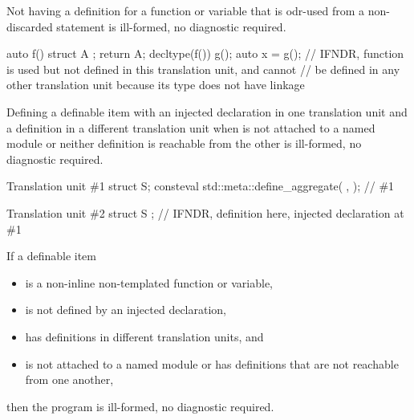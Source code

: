 
\pnum
Not having a definition
for a function or variable
that is odr-used from a non-discarded statement
is ill-formed, no diagnostic required.

\pnum
\begin{example}
\begin{codeblock}
auto f() {
  struct A {};
  return A{};
}
decltype(f()) g();
auto x = g();   // IFNDR, function  is used but not defined in this translation unit, and cannot
                // be defined in any other translation unit because its type does not have linkage
\end{codeblock}
\end{example}


\pnum
Defining a definable item 
with an injected declaration
in one translation unit and
a definition in a different translation unit
when  is not attached to a named module
or neither definition is reachable from the other
is ill-formed, no diagnostic required.

\pnum
\begin{example}
\begin{codeblocktu}{Translation unit \#1}
struct S;
consteval { std::meta::define_aggregate(^^S, {}); }     // \#1
\end{codeblocktu}
\begin{codeblocktu}{Translation unit \#2}
struct S {};    // IFNDR, definition here, injected declaration at \#1
\end{codeblocktu}
\end{example}


\pnum
If a definable item 
\begin{itemize}
\item
is a non-inline non-templated function or variable,
\item
is not defined by an injected declaration,
\item
has definitions in different translation units, and
\item
is not attached to a named module or
has definitions that are not reachable from one another,
\end{itemize}
then the program is ill-formed, no diagnostic required.

